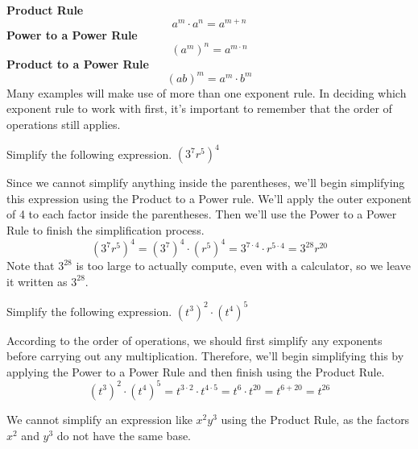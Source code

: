\documentclass{ximera}
\begin{document}
\textbf{Product Rule}
$$
            a^{m} \cdot a^{n} = a^{m+n}
$$
\textbf{Power to a Power Rule}
   $$
           (a^{m})^{n} = a^{m\cdot n}
   $$
 \textbf{ Product to a Power Rule}
   $$
           (ab)^{m} = a^{m} \cdot b^{m}
   $$  
      Many examples will make use of more than one exponent rule.
      In deciding which exponent rule to work with first,
      it's important to remember that the order of operations still applies.
\begin{example} Simplify the following expression.
                $\left(3^7r^5\right)^4$\\
    \begin{explanation}
                Since we cannot simplify anything inside the parentheses, we'll begin simplifying this expression using the Product to a Power rule.
                We'll apply the outer exponent of 4 to each factor inside the parentheses.
                Then we'll use the Power to a Power Rule to finish the simplification process.
      $$          
                  \left(3^7r^5\right)^4 = \left(3^7\right)^4 \cdot \left(r^5\right)^4
                  = 3^{7\cdot4} \cdot r^{5\cdot 4}
                  = 3^{28}r^{20}
         $$      
                Note that $3^{28}$ is too large to actually compute, even with a calculator,
                so we leave it written as $3^{28}$.
\end{explanation}
\end{example}
\begin{example}
Simplify the following expression.
       $\left(t^3\right)^2\cdot \left(t^4\right)^5$\\
\begin{explanation}
                According to the order of operations,
                we should first simplify any exponents before carrying out any multiplication.
                Therefore, we'll begin simplifying this by applying the Power to a Power Rule and then finish using the Product Rule.
           $$
                  \left(t^3\right)^2\cdot \left(t^4\right)^5 = t^{3\cdot2}\cdot t^{4\cdot5}
                  = t^6 \cdot t^{20}
                  = t^{6+20}
                  = t^{26}
$$
\end{explanation}
\end{example}
 \begin{remark} 
        We cannot simplify an expression like $x^2y^3$ using the Product Rule,
        as the factors $x^2$ and $y^3$ do not have the same base.
\end{remark}
\end{document}
